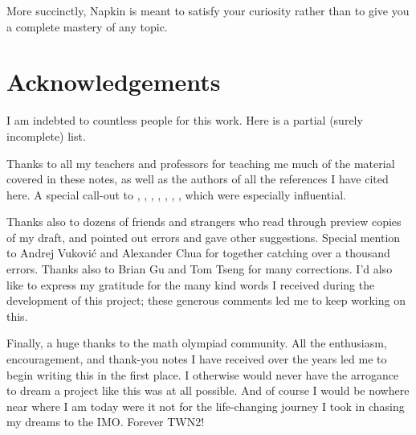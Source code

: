 More succinctly, Napkin is meant to satisfy your curiosity
rather than to give you a complete mastery of any topic.


\section*{Acknowledgements}
I am indebted to countless people for this work.
Here is a partial (surely incomplete) list.

Thanks to all my teachers and professors for teaching me much of the
material covered in these notes,
as well as the authors of all the references I have cited here.
A special call-out to \cite{ref:55a}, \cite{ref:msci},
\cite{ref:manifolds}, \cite{ref:gathmann}, \cite{ref:18-435},
\cite{ref:etingof}, \cite{ref:145a}, which were especially influential.

Thanks also to dozens of friends and strangers
who read through preview copies of my draft,
and pointed out errors and gave other suggestions.
Special mention to Andrej Vukovi\'c and Alexander Chua
for together catching over a thousand errors.
Thanks also to Brian Gu and Tom Tseng for many corrections.
I'd also like to express my gratitude for the many kind words I received
during the development of this project;
these generous comments led me to keep working on this.

Finally, a huge thanks to the math olympiad community.
All the enthusiasm, encouragement, and thank-you notes I have received
over the years led me to begin writing this in the first place.
I otherwise would never have the arrogance to dream a project like this
was at all possible.
And of course I would be nowhere near where I am today were it not for the
life-changing journey I took in chasing my dreams to the IMO.
Forever TWN2!

